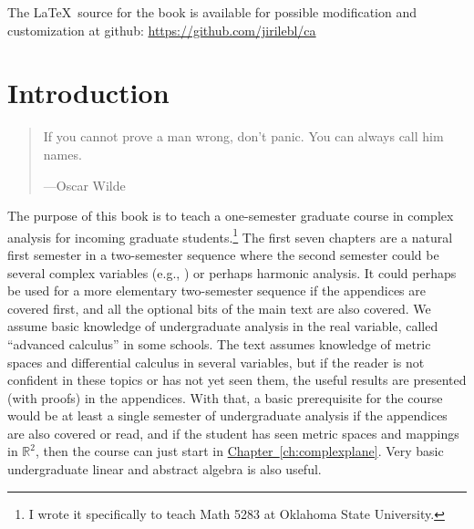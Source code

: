 \documentclass[12pt,openany]{book}
\newcommand{\R}{{\mathbb{R}}}
\newcommand{\myquote}[1]{``#1''}
\theoremstyle{plain}
\theoremstyle{remark}
\theoremstyle{definition}
\newenvironment{myepigraph}{%
    \begin{quote}%
    \begingroup\itshape
}{%
    \endgroup%
    \end{quote}
}
\theoremstyle{exercise}
\theoremstyle{example}
\newcommand{\Chapterref}[1]{\hyperref[#1]{Chapter~\ref*{#1}}}
\begin{document}
\medskip

\noindent
The \LaTeX\ source for the book is available
for possible modification and customization
at github: \url{https://github.com/jirilebl/ca}



\tableofcontents
{}



\chapter*{Introduction} \label{ch:intro}

\begin{myepigraph}
If you cannot prove a man wrong, don't panic. You can always call him names.

---Oscar Wilde 
\end{myepigraph}

The purpose of this book is to teach a one-semester graduate course in
complex analysis for incoming graduate students.\footnote{I wrote it
specifically to teach Math 5283 at Oklahoma State University.}
The first seven chapters are a natural first semester in a two-semester sequence where the second
semester could be several complex variables (e.g., \cite{scv:book})
or perhaps harmonic analysis.
It could perhaps be used for a more elementary two-semester sequence if the
appendices are covered first, and all the optional bits of the main text are
also covered.
We assume basic knowledge of undergraduate
analysis in the real variable, called \myquote{advanced calculus} in some schools.
The text assumes knowledge of metric spaces
and differential calculus in several variables, but if the reader is not
confident in these topics or has not yet seen them, the useful results
are presented (with proofs) in the appendices.
With that, a basic prerequisite for the
course would be at least a single semester of undergraduate analysis if the
appendices are also covered or read, and if the student has
seen metric spaces and mappings in $\R^2$, then the course
can just start in \Chapterref{ch:complexplane}.  Very basic undergraduate
linear and abstract algebra is also useful.
\end{document}
